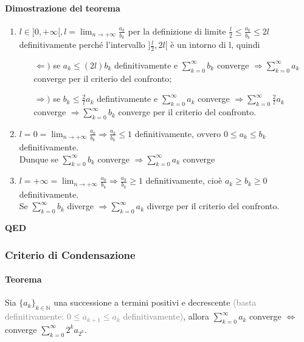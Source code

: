\documentclass{article}
\newcommand{\N}{\mathbb{N}}
\begin{document}
\paragraph{{Dimostrazione del teorema}}
\begin{enumerate}
    \item $l\in ]0,+\infty[,l=\lim_{n \rightarrow + \infty} \frac{a_k}{b_k}$ per la definizione di limite $\frac{l}{2}\leq\frac{a_k}{b_k} \leq 2l$ definitivamente perché l'intervallo $]\frac{l}{2},2l[$ è un intorno di l, quindi
    \begin{itemize}
        \item[$\Leftarrow)$] se $a_k\leq (2l)b_k$ definitivamente e $\sum_{k=0}^{\infty} b_k$ converge $\Rightarrow \sum_{k=0}^{\infty} a_k$ converge per il criterio del confronto;
        \item[$\Rightarrow)$] se $b_k \leq \frac{2}{l} a_k$ defintivamente e $\sum_{k=0}^{\infty} a_k$ converge $\Rightarrow \sum_{k=0}^{\infty} \frac{2}{l} a_k$ converge $\Rightarrow \sum_{k=0}^{\infty} b_k$ converge per il criterio del confronto.
    \end{itemize}
    \item $l=0=\lim_{n \rightarrow +\infty} \frac{a_k}{b_k} \Rightarrow \frac{a_k}{b_k} \leq 1$ definitivamente, ovvero $0\leq a_k \leq b_k $ definitivamente. \\
    Dunque se $\sum_{k=0}^{\infty} b_k $ converge $\Rightarrow \sum_{k=0}^{\infty} a_k $ converge
    \item $l=+\infty = \lim_{n \rightarrow +\infty} \frac{a_k}{b_k} \Rightarrow \frac{a_k}{b_k} \geq 1$ definitivamente, cioè $a_k \geq b_k \geq 0$ definitivamente.
    \\Se $\sum_{k=0}^{\infty} b_k$ diverge $ \Rightarrow \sum_{k=0}^{\infty} a_k$ diverge per il criterio del confronto.
\end{enumerate}
\begin{flushright}
\textbf{QED}
\end{flushright}

\subsubsection{{Criterio di Condensazione}}
\paragraph{{Teorema}}
Sia $ \{a_k\}_{k \in \N}$ una successione a termini positivi e decrescente \textcolor{grey}{(basta definitivamente: $0 \leq a_{k+1} \leq a_k$ definitivamente)}, allora $\sum_{k=0}^{\infty} a_k$ converge $\Leftrightarrow$ converge $\sum_{k=0}^{\infty} 2^k a_{2^k}$.
\end{document}
